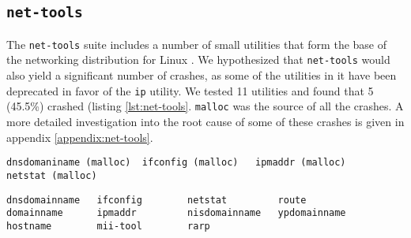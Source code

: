 \subsection{\texttt{net-tools}}
The \texttt{net-tools} suite includes a number of small utilities that form the base of the networking distribution for Linux \cite{nettools}. We hypothesized that \texttt{net-tools} would also yield a significant number of crashes, as some of the utilities in it have been deprecated in favor of the \texttt{ip} utility. We tested 11 utilities and found that 5 (45.5\%) crashed (listing \ref{lst:net-tools}. \texttt{malloc} was the source of all  the crashes. A more detailed investigation into the root cause of some of these crashes is given in appendix \ref{appendix:net-tools}.

\begin{lstlisting}[label={lst:net-tools_crashes},caption={Crashes in net-tools}]
dnsdomaniname (malloc)	ifconfig (malloc)	ipmaddr (malloc)	netstat (malloc)
\end{lstlisting}

\begin{lstlisting}[label={lst:net-tools},caption={Crashes in net-tools}]
dnsdomainname   ifconfig        netstat         route
domainname      ipmaddr         nisdomainname   ypdomainname
hostname        mii-tool        rarp
\end{lstlisting}
